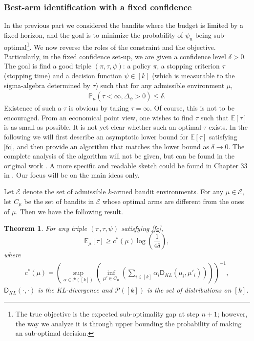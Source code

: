 \documentclass[10pt,a4article]{article}
\numberwithin{equation}{section}
\theoremstyle{plain}
\newtheorem{Th}{Theorem}[section]
\theoremstyle{definition}
\def\E{{\mathbb E}}
\def\P{{\mathbb P}}
\begin{document}
\subsubsection{Best-arm identification with a fixed confidence}

In the previous part we considered the bandits where the budget is limited by a fixed horizon, and the goal is to minimize the probability of $\psi_n$ being sub-optimal\footnote{The true objective is the expected sub-optimality gap at step $n+1$; however, the way we analyze it is through upper bounding the probability of making an sub-optimal decision.}. We now reverse the roles of the constraint and the objective. Particularly, in the fixed confidence set-up, we are given a confidence level $\delta>0$. The goal is find a good triple $(\pi, \tau, \psi)$: a policy $\pi$, a stopping criterion $\tau$ (stopping time) and a decision function $\psi\in [k]$ (which is measurable to the sigma-algebra determined by $\tau$) such that for any admissible environment $\mu$, 
\begin{align}
\P_{\mu}\left(\tau<\infty, \Delta_\psi>0\right)\leq \delta. \label{fc}
\end{align}
Existence of such a $\tau$ is obvious by taking $\tau=\infty$. Of course, this is not to be encouraged. From an economical point view, one wishes to find $\tau$ such that $\E[\tau]$ is as small as possible. It is not yet clear whether such an optimal $\tau$ exists. In the following we will first describe an asymptotic lower bound for $\E[\tau]$ satisfying \eqref{fc}, and then provide an algorithm that matches the lower bound as $\delta\to 0$. The complete analysis of the algorithm will not be given, but can be found in the original work \cite{garivier2016optimal}. A more specific and readable sketch could be found in Chapter 33 in \cite{lattimore2018bandit}. Our focus will be on the main ideas only. 

Let $\mathcal E$ denote the set of admissible $k$-armed bandit environments. For any $\mu\in\mathcal E$, let $C_\mu$ be the set of bandits in $\mathcal E$ whose optimal arms are different from the ones of $\mu$. Then we have the following result. 

\begin{Th}\label{ba:lb}
For any triple $(\pi, \tau, \psi)$ satisfying \eqref{fc}, $$\E_\mu[\tau]\geq c^*(\mu)\log\left(\frac{1}{4\delta}\right),$$ where
\begin{align*}
c^*(\mu)=\left(\sup_{\alpha\in\mathcal P([k])}\left(\inf_{\mu'\in C_\mu}\left(\sum_{i\in [k]}\alpha_i\mathsf D_{KL}(\mu_i, \mu'_i)\right)\right)\right)^{-1},
\end{align*}
$\mathsf D_{KL}(\cdot, \cdot)$ is the KL-divergence and $\mathcal P([k])$ is the set of distributions on $[k]$. 
\end{Th}
\end{document}
